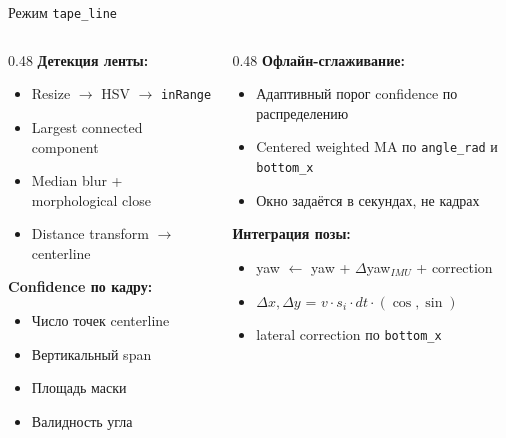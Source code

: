 \documentclass[aspectratio=169]{beamer}
\newcommand{\code}[1]{\texttt{#1}}
\begin{document}
\begin{frame}{Режим \code{tape\_line}}
    \begin{columns}[t]
        \begin{column}{0.48\textwidth}
            \textbf{Детекция ленты:}
            \begin{itemize}
                \item Resize $\to$ HSV $\to$ \code{inRange}
                \item Largest connected component
                \item Median blur + morphological close
                \item Distance transform $\to$ centerline
            \end{itemize}

            \textbf{Confidence по кадру:}
            \begin{itemize}
                \item Число точек centerline
                \item Вертикальный span
                \item Площадь маски
                \item Валидность угла
            \end{itemize}
        \end{column}
        \begin{column}{0.48\textwidth}
            \textbf{Офлайн-сглаживание:}
            \begin{itemize}
                \item Адаптивный порог confidence по распределению
                \item Centered weighted MA по \code{angle\_rad} и \code{bottom\_x}
                \item Окно задаётся в секундах, не кадрах
            \end{itemize}

            \textbf{Интеграция позы:}
            \begin{itemize}
                \item yaw $\leftarrow$ yaw + $\Delta$yaw$_{IMU}$ + correction
                \item $\Delta x, \Delta y$ = $v \cdot s_i \cdot dt \cdot (\cos, \sin)$
                \item lateral correction по \code{bottom\_x}
            \end{itemize}
        \end{column}
    \end{columns}
\end{frame}
\end{document}
